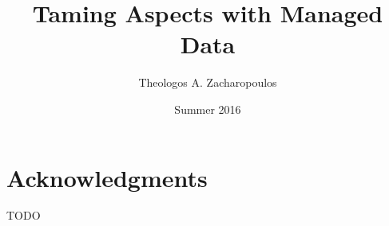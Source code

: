 \documentclass{uvamscse}
\title{Taming Aspects with Managed Data }
\date{Summer 2016}
\author{Theologos A. Zacharopoulos}
\begin{document}

\maketitle








% 
\chapter*{Acknowledgments}
TODO

\printglossary

% 
% 

{%
  
  
}
\end{document}
